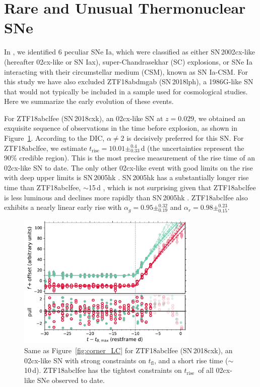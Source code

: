 \documentclass[twocolumn]{./aastex63}
\newcommand{\tfl}{$t_\mathrm{fl}$}
\newcommand{\trise}{$t_\mathrm{rise}$}
\begin{document}
\section{Rare and Unusual Thermonuclear SNe}\label{sec:rare}

In \citet{Yao19}, we identified 6 peculiar SNe Ia, which were classified as
either SN\,2002cx-like (hereafter 02cx-like or SN Iax), super-Chandrasekhar (SC)
explosions, or SNe Ia interacting with their circumstellar medium (CSM), known
as SN Ia-CSM. For this study we have also excluded ZTF18abdmgab (SN\,2018lph), a
1986G-like SN that would not typically be included in a sample used for
cosmological studies. Here we summarize the early evolution of these events.

For ZTF18abclfee (SN\,2018cxk), an 02cx-like SN at $z = 0.029$, we obtained an
exquisite sequence of observations in the time before explosion, as shown in
Figure~\ref{fig:02cx}. According to the DIC, $\alpha \ne 2$ is decisively
preferred for this SN. For ZTF18abclfee, we estimate \trise$ = 10.01
\pm^{0.4}_{0.33}$\,d (the uncertainties represent the 90\% credible region).
This is the most precise measurement of the rise time of an 02cx-like SN to
date. The only other 02cx-like event with good limits on the rise with deep
upper limits is SN\,2005hk \citep{Phillips07}. SN\,2005hk has a substantially
longer rise time than ZTF18abclfee, $\sim$15\,d \citep{Phillips07}, which is not
surprising given that ZTF18abclfee is less luminous and declines more rapidly
than SN\,2005hk \citep{Miller17a,Yao19}. ZTF18abclfee also exhibits a nearly
linear early rise with $\alpha_g = 0.95 \pm^{0.32}_{0.19}$ and $\alpha_r = 0.98
\pm^{0.23}_{0.15}$.

\begin{figure}
    \centering
    \includegraphics[width=3.4in]{./figures/ZTF18abclfee_model_lc.pdf}
    \caption{Same as Figure~\ref{fig:corner_LC} for ZTF18abclfee (SN\,2018cxk),
    an 02cx-like SN with strong constraints on \tfl, and a short rise time
    ($\sim$10\,d). ZTF18abclfee has the tightest constraints on \trise\ of all
    02cx-like SNe observed to date.}
    \label{fig:02cx}
\end{figure}
\end{document}
